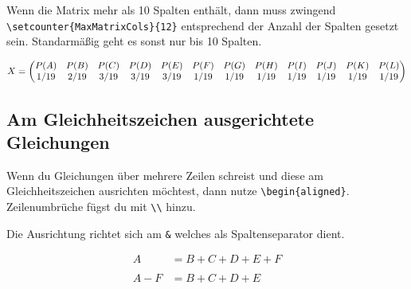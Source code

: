 \documentclass[
    12pt,
    a4paper,
            ngerman,
        bibliography=totocnumbered,
    listof=totocnumbered
]{scrartcl}
\begin{document}
Wenn die Matrix mehr als 10 Spalten enthält, dann muss zwingend
\texttt{\textbackslash{}setcounter\{MaxMatrixCols\}\{12\}} entsprechend
der Anzahl der Spalten gesetzt sein. Standarmäßig geht es sonst nur bis
10 Spalten.

\[
\setcounter{MaxMatrixCols}{12}X = 
 \begin{pmatrix}
P(A) & P(B) & P(C) & P(D) & P(E) & P(F) & P(G) & P(H) & P(I) & P(J) & P(K) & P(L)\\
1/19 & 2/19 & 3/19 & 3/19 & 3/19 & 1/19 & 1/19 & 1/19 & 1/19 & 1/19 & 1/19 & 1/19\\
\end{pmatrix}\]

\hypertarget{am-gleichheitszeichen-ausgerichtete-gleichungen}{%
\subsection{Am Gleichheitszeichen ausgerichtete
Gleichungen}\label{am-gleichheitszeichen-ausgerichtete-gleichungen}}

Wenn du Gleichungen über mehrere Zeilen schreist und diese am
Gleichheitszeichen ausrichten möchtest, dann nutze
\texttt{\textbackslash{}begin\{aligned\}}. Zeilenumbrüche fügst du mit
\texttt{\textbackslash{}\textbackslash{}} hinzu.

Die Ausrichtung richtet sich am \texttt{\&} welches als Spaltenseparator
dient.

\[ \displaystyle
\begin{aligned}
A &  = B + C + D + E + F\\
& \\
 A - F & = B + C + D + E 
\end{aligned}\]






%
\end{document}
